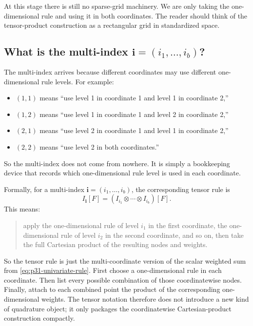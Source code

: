 \documentclass[11pt]{article}
\numberwithin{equation}{section}
\begin{document}
At this stage there is still no sparse-grid machinery.  We are only taking the
one-dimensional rule and using it in both coordinates.  The reader should think
of the tensor-product construction as a rectangular grid in standardized space.

\subsection{What is the multi-index \texorpdfstring{\(\mathbf i=(i_1,\ldots,i_b)\)}{i=(i1,...,ib)}?}

The multi-index arrives because different coordinates may use different
one-dimensional rule levels.  For example:
\begin{itemize}[leftmargin=0.28in]
  \item \((1,1)\) means ``use level 1 in coordinate 1 and level 1 in coordinate
  2,''
  \item \((1,2)\) means ``use level 1 in coordinate 1 and level 2 in coordinate
  2,''
  \item \((2,1)\) means ``use level 2 in coordinate 1 and level 1 in coordinate
  2,''
  \item \((2,2)\) means ``use level 2 in both coordinates.''
\end{itemize}
So the multi-index does not come from nowhere.  It is simply a bookkeeping device
that records which one-dimensional rule level is used in each coordinate.

Formally, for a multi-index \(\mathbf i=(i_1,\ldots,i_b)\), the corresponding
tensor rule is
\begin{equation}
  I_{\mathbf i}[F]
  =
  (I_{i_1}\otimes\cdots\otimes I_{i_b})[F].
  \label{eq:p31-tensor-rule}
\end{equation}
This means:
\begin{quote}
apply the one-dimensional rule of level \(i_1\) in the first coordinate, the
one-dimensional rule of level \(i_2\) in the second coordinate, and so on, then
take the full Cartesian product of the resulting nodes and weights.
\end{quote}
So the tensor rule is just the multi-coordinate version of the scalar weighted
sum from \eqref{eq:p31-univariate-rule}.  First choose a one-dimensional rule in
each coordinate.  Then list every possible combination of those coordinatewise
nodes.  Finally, attach to each combined point the product of the corresponding
one-dimensional weights.  The tensor notation therefore does not introduce a new
kind of quadrature object; it only packages the coordinatewise Cartesian-product
construction compactly.
\end{document}
